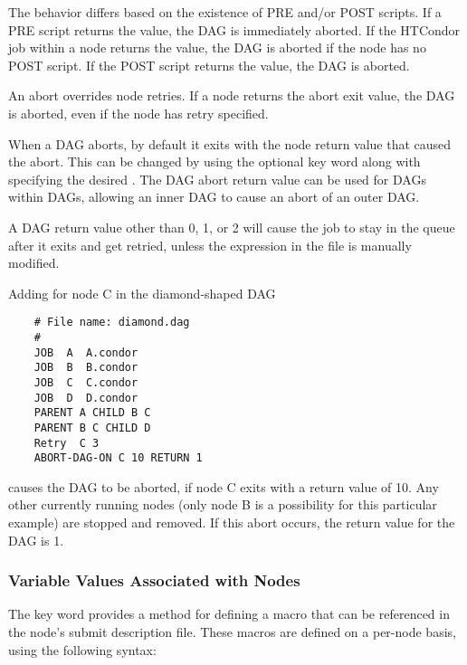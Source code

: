 The behavior differs based on the existence of PRE and/or POST scripts.
If a PRE script returns the  value,
the DAG is immediately aborted.
If the HTCondor job within a node returns the  value,
the DAG is aborted if the node has no POST script.
If the POST script returns the  value, the DAG is aborted.

An abort overrides node retries. 
If a node returns the abort exit value,
the DAG is aborted,
even if the node has retry specified.

When a DAG aborts, by default it exits with the node return value that
caused the abort.  This can be changed by 
using  the optional  key word along
with specifying the desired .
The DAG abort return value
can be used for DAGs within DAGs,
allowing an inner DAG to cause an abort of an outer DAG.

A DAG return value other than 0, 1, or 2 will cause the
 job to stay in the queue after it exits
and get retried, unless the  expression in the
 file is manually modified.

Adding  for node C in the diamond-shaped
DAG
\footnotesize
\begin{verbatim}
    # File name: diamond.dag
    #
    JOB  A  A.condor 
    JOB  B  B.condor 
    JOB  C  C.condor	
    JOB  D  D.condor
    PARENT A CHILD B C
    PARENT B C CHILD D
    Retry  C 3
    ABORT-DAG-ON C 10 RETURN 1
\end{verbatim}
\normalsize

causes the DAG to be aborted, if node C exits with a return value of 10.
Any other currently running nodes (only node B is a possibility for 
this particular example) are stopped and removed.
If this abort occurs, the return value for the DAG is 1.


\subsubsection{\label{dagman:VARS}Variable Values Associated with Nodes}

The  key word provides a
method for defining a macro that can be referenced in the
node's submit description file.
These macros are defined on a per-node basis, using the
following syntax:

